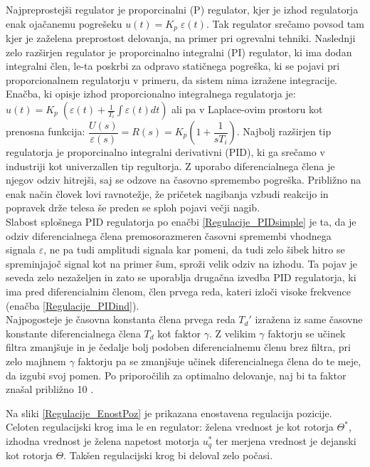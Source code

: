 \documentclass[a4paper,twoside,openright,12pt]{book}
\begin{document}
Najpreprostejši regulator je proporcinalni (P) regulator, kjer je izhod regulatorja enak ojačanemu pogrešeku $u(t)=K_p\;\varepsilon(t)$. Tak regulator srečamo povsod tam kjer je zaželena preprostost delovanja, na primer pri ogrevalni tehniki. Naslednji zelo razširjen regulator je proporcinalno integralni (PI) regulator, ki ima dodan integralni člen, le-ta poskrbi za odpravo statičnega pogreška, ki se pojavi pri proporcionalnem regulatorju v primeru, da sistem nima izražene integracije. Enačba, ki opisje izhod proporcionalno integralnega regulatorja je: $u(t)=K_p\;(\varepsilon(t)+\frac{1}{T_i}\int\varepsilon(t)dt)$ ali pa v Laplace-ovim prostoru kot prenosna funkcija: $\dfrac{U(s)}{\varepsilon(s)}=R(s)=K_p(1+\dfrac{1}{sT_i})$. Najbolj razširjen tip regulatorja je proporcinalno integralni derivativni (PID), ki ga srečamo v industriji kot univerzallen tip regultorja. Z uporabo diferencialnega člena je njegov odziv hitrejši, saj se odzove na časovno spremembo pogreška. Približno na enak način človek lovi ravnotežje, že pričetek nagibanja vzbudi reakcijo in popravek drže telesa še preden se sploh pojavi večji nagib.\\
 Slabost splošnega PID regulatorja po enačbi \ref{Regulacije_PIDsimple} je ta, da je odziv diferencialnega člena premosorazmeren časovni spremembi vhodnega signala $\varepsilon$, ne pa tudi amplitudi signala kar pomeni, da tudi zelo šibek hitro se spreminjajoč signal kot na primer šum, sproži velik odziv na izhodu. Ta pojav je seveda zelo nezaželjen in zato se uporablja drugačna izvedba PID regulatorja, ki ima pred diferencialnim členom, člen prvega reda, kateri izloči visoke frekvence (enačba \ref{Regulacije_PIDind}).\\

Najpogosteje je časovna konstanta člena prvega reda $T_d'$ izražena iz same časovne konstante diferencialnega člena $T_d$ kot faktor $\gamma$. Z velikim  $\gamma$ faktorju se učinek filtra zmanjšuje in je čedalje bolj podoben diferencialnemu členu brez filtra, pri zelo majhnem $\gamma$ faktorju pa se zmanjšuje učinek diferencialnega člena do te meje, da izgubi svoj pomen. Po priporočilih za optimalno delovanje, naj bi ta faktor znašal približno 10 \cite{bobal2006digital}.

Na sliki \ref{Regulacije_EnostPoz} je prikazana enostavena regulacija pozicije. Celoten regulacijski krog ima le en regulator: želena vrednost je kot rotorja $\Theta^*$, izhodna vrednost je želena napetost motorja $u_q^*$ ter merjena vrednost je dejanski kot rotorja $\Theta$. Takšen regulacijski krog bi deloval zelo počasi.\\
\end{document}
